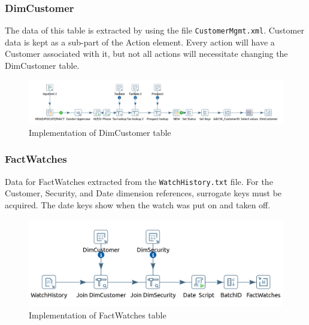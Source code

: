 \documentclass{article}
\newcommand\pcw[1]{\texttt{#1}}
\begin{document}
\subsubsection{DimCustomer}
The data of this table is extracted by using the file \pcw{CustomerMgmt.xml}. Customer data is kept as a sub-part of the Action element. Every action will have a Customer associated with it, but not all actions will necessitate changing the DimCustomer table.
\begin{figure}[H] 
\begin{center}
\includegraphics[width=15cm]{images2/DimCus.png}
\end{center}
\caption{Implementation of DimCustomer table}
\label{DimCus}
\end{figure} 

\subsubsection{FactWatches}
Data for FactWatches extracted from the \pcw{WatchHistory.txt} file. For the Customer, Security, and Date dimension references, surrogate keys must be acquired. The date keys show when the watch was put on and taken off. 
\begin{figure}[H] 
\begin{center}
\includegraphics[width=15cm]{images2/fctWat.png}
\end{center}
\caption{Implementation of FactWatches table}
\label{fctWat}
\end{figure} 
\end{document}
